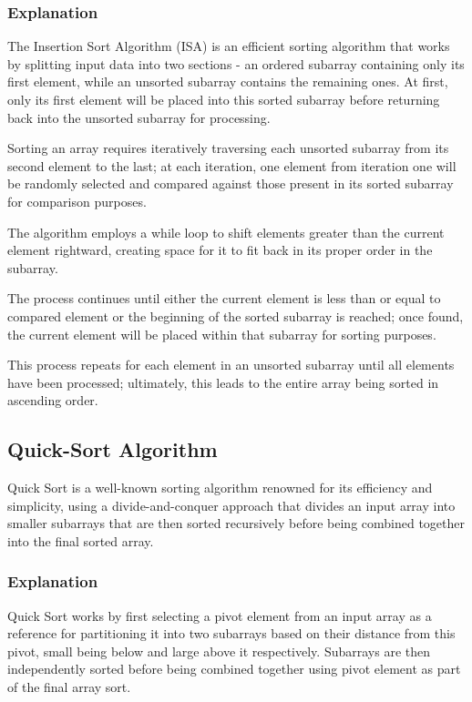 \documentclass{article}
\begin{document}
\subsubsection{Explanation}

The Insertion Sort Algorithm (ISA) is an efficient sorting algorithm that works by splitting input data into two sections - an ordered subarray containing only its first element, while an unsorted subarray contains the remaining ones. At first, only its first element will be placed into this sorted subarray before returning back into the unsorted subarray for processing.

Sorting an array requires iteratively traversing each unsorted subarray from its second element to the last; at each iteration, one element from iteration one will be randomly selected and compared against those present in its sorted subarray for comparison purposes.

The algorithm employs a while loop to shift elements greater than the current element rightward, creating space for it to fit back in its proper order in the subarray.

The process continues until either the current element is less than or equal to compared element or the beginning of the sorted subarray is reached; once found, the current element will be placed within that subarray for sorting purposes.

This process repeats for each element in an unsorted subarray until all elements have been processed; ultimately, this leads to the entire array being sorted in ascending order.

\restoregeometry

\subsection{Quick-Sort Algorithm}

Quick Sort is a well-known sorting algorithm renowned for its efficiency and simplicity, using a divide-and-conquer approach that divides an input array into smaller subarrays that are then sorted recursively before being combined together into the final sorted array.



\subsubsection{Explanation}

Quick Sort works by first selecting a pivot element from an input array as a reference for partitioning it into two subarrays based on their distance from this pivot, small being below and large above it respectively. Subarrays are then independently sorted before being combined together using pivot element as part of the final array sort.
\end{document}
